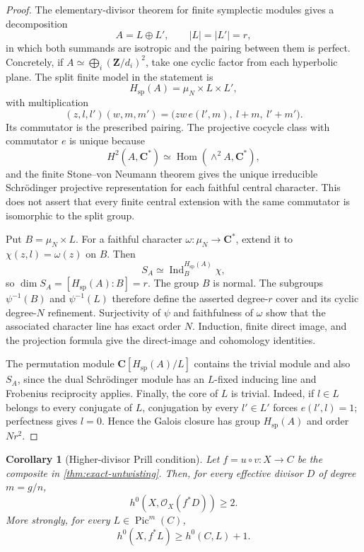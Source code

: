 \documentclass[11pt,reqno]{amsart}
\numberwithin{equation}{section}
\newtheorem{corollary}[corollary]{Corollary}
\theoremstyle{remark}
\DeclareMathOperator{\Pic}{Pic}
\DeclareMathOperator{\Ind}{Ind}
\DeclareMathOperator{\Hom}{Hom}
\newcommand{\cO}{\mathcal O}
\newcommand{\bC}{\mathbf C}
\newcommand{\bZ}{\mathbf Z}
\begin{document}
\begin{proof}
The elementary-divisor theorem for finite symplectic modules gives a
decomposition
\[
 A=L\oplus L',\qquad |L|=|L'|=r,
\]
in which both summands are isotropic and the pairing between them is
perfect.  Concretely, if
\(A\simeq\bigoplus_i(\bZ/d_i)^2\), take one cyclic factor from each
  hyperbolic plane.  The split finite model in the statement is
\[
 H_{\mathrm{sp}}(A)=\mu_N\times L\times L',
\]
with multiplication
\[
 (z,l,l')(w,m,m')=
 \bigl(zw\,e(l',m),\ l+m,\ l'+m'\bigr).
\]
Its commutator is the prescribed pairing.  The projective cocycle class
with commutator \(e\) is unique because
\[
 H^2(A,\bC^*)\simeq\Hom(\wedge^2A,\bC^*),
\]
and the finite Stone--von Neumann theorem gives the unique irreducible
Schr\"odinger projective representation for each faithful central
character.  This does not assert that every finite central extension
with the same commutator is isomorphic to the split group.

Put \(B=\mu_N\times L\).  For a faithful character
\(\omega\colon\mu_N\to\bC^*\), extend it to
\(\chi(z,l)=\omega(z)\) on \(B\).  Then
\[
 S_A\simeq\Ind_B^{H_{\mathrm{sp}}(A)}\chi,
\]
so \(\dim S_A=[H_{\mathrm{sp}}(A):B]=r\).  The group \(B\) is normal.  The subgroups
\(\psi^{-1}(B)\) and \(\psi^{-1}(L)\) therefore define the asserted
degree-\(r\) cover and its cyclic degree-\(N\) refinement.  Surjectivity
of \(\psi\) and faithfulness of \(\omega\) show that the associated
character line has exact order \(N\).  Induction, finite direct image,
and the projection formula give the direct-image and cohomology
identities.

The permutation module \(\bC[H_{\mathrm{sp}}(A)/L]\) contains the trivial module and
also \(S_A\), since the dual Schr\"odinger module has an \(L\)-fixed
inducing line and Frobenius reciprocity applies.  Finally, the core of
\(L\) is trivial.  Indeed, if
\(l\in L\) belongs to every conjugate of \(L\), conjugation by every
\(l'\in L'\) forces \(e(l',l)=1\); perfectness gives \(l=0\).  Hence the
Galois closure has group \(H_{\mathrm{sp}}(A)\) and order \(Nr^2\).
\end{proof}

\begin{corollary}[Higher-divisor Prill condition]\label{cor:higher-prill}
Let \(f=u\circ v\colon X\to C\) be the composite in
\cref{thm:exact-untwisting}.  Then, for every effective divisor \(D\) of
degree \(m=g/n\),
\[
 h^0\!\left(X,\cO_X(f^*D)\right)\geq2.
\tag{4.10}\label{eq:higher-prill}
\]
More strongly, for every \(L\in\Pic^m(C)\),
\[
 h^0(X,f^*L)\geq h^0(C,L)+1.
\tag{4.11}\label{eq:full-pic-pullback}
\]
\end{corollary}
\end{document}

